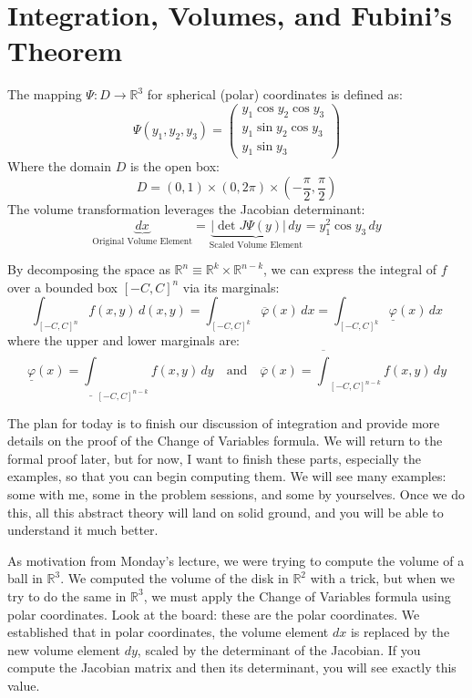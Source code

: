 \section{Integration, Volumes, and Fubini's Theorem}

\begin{nice-box}
The mapping $\Psi: D \to \mathbb{R}^3$ for spherical (polar) coordinates is defined as:
\[
\Psi(y_1, y_2, y_3) = 
\begin{pmatrix} 
y_1 \cos y_2 \cos y_3 \\ 
y_1 \sin y_2 \cos y_3 \\ 
y_1 \sin y_3 
\end{pmatrix}
\]
Where the domain $D$ is the open box:
\[
D = (0, 1) \times (0, 2\pi) \times \left(-\frac{\pi}{2}, \frac{\pi}{2}\right)
\]
The volume transformation leverages the Jacobian determinant:
\[
\underbrace{dx}_{\text{Original Volume Element}} = \underbrace{|\det J\Psi(y)| \, dy}_{\text{Scaled Volume Element}} = y_1^2 \cos y_3 \, dy
\]
\end{nice-box}

\begin{orange-formula}
\begin{theorem}
By decomposing the space as $\mathbb{R}^n \equiv \mathbb{R}^k \times \mathbb{R}^{n-k}$, we can express the integral of $f$ over a bounded box $[-C,C]^n$ via its marginals:
\[
\int_{[-C,C]^n} f(x,y) \, d(x,y) = \int_{[-C,C]^k} \overline{\varphi}(x) \, dx = \int_{[-C,C]^k} \underline{\varphi}(x) \, dx
\]
where the upper and lower marginals are:
\[
\underline{\varphi}(x) = \underline{\int}_{[-C,C]^{n-k}} f(x,y) \, dy \quad \text{and} \quad \overline{\varphi}(x) = \overline{\int}_{[-C,C]^{n-k}} f(x,y) \, dy
\]
\end{theorem}
\end{orange-formula}

\begin{spoken-clean}[00:00:03 - 00:02:08]
The plan for today is to finish our discussion of integration and provide more details on the proof of the Change of Variables formula. We will return to the formal proof later, but for now, I want to finish these parts, especially the examples, so that you can begin computing them. We will see many examples: some with me, some in the problem sessions, and some by yourselves. Once we do this, all this abstract theory will land on solid ground, and you will be able to understand it much better.

As motivation from Monday's lecture, we were trying to compute the volume of a ball in $\mathbb{R}^3$. We computed the volume of the disk in $\mathbb{R}^2$ with a trick, but when we try to do the same in $\mathbb{R}^3$, we must apply the Change of Variables formula using polar coordinates. Look at the board: these are the polar coordinates. We established that in polar coordinates, the volume element $dx$ is replaced by the new volume element $dy$, scaled by the determinant of the Jacobian. If you compute the Jacobian matrix and then its determinant, you will see exactly this value.
\end{spoken-clean}

